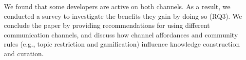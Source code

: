 We found that some developers are active on both channels. As a result, we conducted a survey to investigate the benefits they gain by doing so (RQ3). We conclude the paper by providing recommendations for using different communication channels, and discuss how channel affordances and community rules (e.g., topic restriction and gamification) influence knowledge construction and curation.



